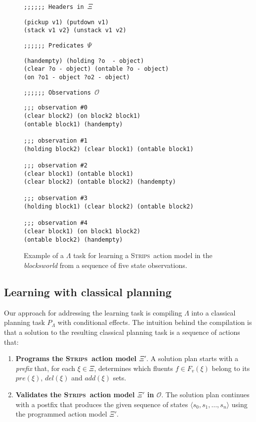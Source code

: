 \documentclass{article}
\newcommand{\tup}[1]{{\langle #1 \rangle}}
\newcommand{\strips}{\textsc{Strips}}     %
\begin{document}
\begin{figure}
{\footnotesize\tt ;;;;;; Headers in $\Xi$}
\begin{footnotesize}
\begin{verbatim}
(pickup v1) (putdown v1)
(stack v1 v2} (unstack v1 v2)
\end{verbatim}
\end{footnotesize}
\vspace{0.2cm}
{\footnotesize\tt ;;;;;; Predicates $\Psi$}
\begin{footnotesize}
\begin{verbatim}
(handempty) (holding ?o  - object)
(clear ?o - object) (ontable ?o - object)
(on ?o1 - object ?o2 - object)
\end{verbatim}
\end{footnotesize}
\vspace{0.2cm}
{\footnotesize\tt ;;;;;; Observations $\mathcal{O}$}
\begin{footnotesize}
\begin{verbatim}
;;; observation #0
(clear block2) (on block2 block1)
(ontable block1) (handempty)

;;; observation #1
(holding block2) (clear block1) (ontable block1)

;;; observation #2
(clear block1) (ontable block1)
(clear block2) (ontable block2) (handempty)

;;; observation #3
(holding block1) (clear block2) (ontable block2)

;;; observation #4
(clear block1) (on block1 block2)
(ontable block2) (handempty)
\end{verbatim}
\end{footnotesize}
 \caption{\small Example of a $\Lambda$ task for learning a \strips\ action model in the {\em blocksworld} from a sequence of five state observations.}
\label{fig:lexample}
\end{figure}


\subsection{Learning with classical planning}

Our approach for addressing the learning task is compiling $\Lambda$ into a classical planning task $P_{\Lambda}$ with conditional effects. The intuition behind the compilation is that a solution to the resulting classical planning task is a sequence of actions that:

\begin{enumerate}
\item {\bf Programs the \strips\ action model $\Xi'$}. A solution plan starts with a {\em prefix} that, for each $\xi\in\Xi$, determines which fluents $f\in F_v(\xi)$ belong to its $pre(\xi)$, $del(\xi)$ and $add(\xi)$ sets.
\item {\bf Validates the \strips\ action model $\Xi'$ in $\mathcal{O}$}. The solution plan continues with a postfix that produces the given sequence of states $\tup{s_0,s_1,\ldots,s_{n}}$ using the programmed action model $\Xi'$.
\end{enumerate}
\end{document}
